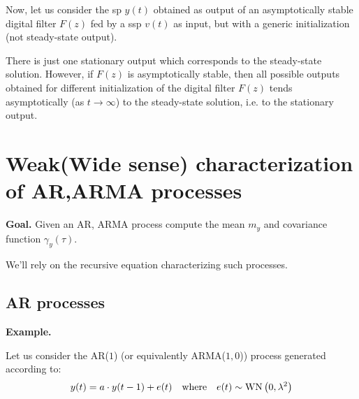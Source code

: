 Now, let us consider the \gls{sp} $y(t)$ obtained as output of an asymptotically stable digital filter $F(z)$ fed by a \gls{ssp} $v(t)$ as input, but with a generic initialization (not steady-state output).

\begin{figure}[htpb]
	\centering
\end{figure}
\FloatBarrier

\begin{theorem}
	There is just one stationary output which corresponds to the steady-state solution. However, if $F(z)$ is asymptotically stable, then all possible outputs obtained for different initialization of the digital filter $F(z)$ tends asymptotically (as $t \rightarrow \infty$) to the steady-state solution, i.e. to the stationary output.
\end{theorem}


\section{Weak(Wide sense) characterization of AR,ARMA processes}
\textbf{Goal.} Given an AR, ARMA process compute the mean $m_y$ and covariance function $\gamma_y(\tau)$.


We'll rely on the recursive equation characterizing such processes.

\subsection{AR processes}
\textbf{Example.}

Let us consider the AR($1$) (or equivalently ARMA($1,0$)) process generated according to:
\begin{align*}
	y(t)=a \cdot y(t-1)+e(t) \quad \text{where} \quad e(t) \sim \operatorname{WN}\left(0, \lambda^{2}\right)
\end{align*}


